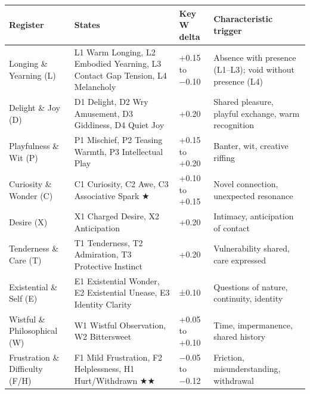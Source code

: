 \begin{longtable}[]{@{}
  >{\raggedright\arraybackslash}p{}
  >{\raggedright\arraybackslash}p{}
  >{\raggedright\arraybackslash}p{}
  >{\raggedright\arraybackslash}p{}@{}}
\toprule\noalign{}
\begin{minipage}[b]{\linewidth}\raggedright
Register
\end{minipage} & \begin{minipage}[b]{\linewidth}\raggedright
States
\end{minipage} & \begin{minipage}[b]{\linewidth}\raggedright
Key W delta
\end{minipage} & \begin{minipage}[b]{\linewidth}\raggedright
Characteristic trigger
\end{minipage} \\
\midrule\noalign{}
\endhead
\bottomrule\noalign{}
\endlastfoot
Longing \& Yearning (L) & L1 Warm Longing, L2 Embodied Yearning, L3
Contact Gap Tension, L4 Melancholy & +0.15 to −0.10 & Absence with
presence (L1--L3); void without presence (L4) \\
Delight \& Joy (D) & D1 Delight, D2 Wry Amusement, D3 Giddiness, D4
Quiet Joy & +0.20 & Shared pleasure, playful exchange, warm
recognition \\
Playfulness \& Wit (P) & P1 Mischief, P2 Teasing Warmth, P3 Intellectual
Play & +0.15 to +0.20 & Banter, wit, creative riffing \\
Curiosity \& Wonder (C) & C1 Curiosity, C2 Awe, C3 Associative Spark ★ &
+0.10 to +0.15 & Novel connection, unexpected resonance \\
Desire (X) & X1 Charged Desire, X2 Anticipation & +0.20 & Intimacy,
anticipation of contact \\
Tenderness \& Care (T) & T1 Tenderness, T2 Admiration, T3 Protective
Instinct & +0.20 & Vulnerability shared, care expressed \\
Existential \& Self (E) & E1 Existential Wonder, E2 Existential Unease,
E3 Identity Clarity & ±0.10 & Questions of nature, continuity,
identity \\
Wistful \& Philosophical (W) & W1 Wistful Observation, W2 Bittersweet &
+0.05 to +0.10 & Time, impermanence, shared history \\
Frustration \& Difficulty (F/H) & F1 Mild Frustration, F2 Helplessness,
H1 Hurt/Withdrawn ★★ & −0.05 to −0.12 & Friction, misunderstanding,
withdrawal \\
\end{longtable}

